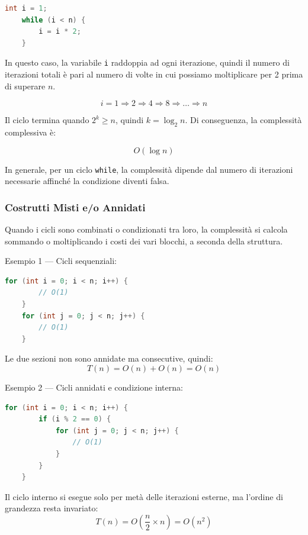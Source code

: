 \begin{lstlisting}[language=C++]
	int i = 1;
	while (i < n) {
		i = i * 2;
	}
\end{lstlisting}

In questo caso, la variabile \texttt{i} raddoppia ad ogni iterazione, quindi il numero di iterazioni totali è pari al numero di volte in cui possiamo moltiplicare per 2 prima di superare $n$.

\[
i = 1 \Rightarrow 2 \Rightarrow 4 \Rightarrow 8 \Rightarrow \dots \Rightarrow n
\]

Il ciclo termina quando $2^k \ge n$, quindi $k = \log_2 n$.  
Di conseguenza, la complessità complessiva è:

\[
O(\log n)
\]

In generale, per un ciclo \texttt{while}, la complessità dipende dal numero di iterazioni necessarie affinché la condizione diventi falsa.


\vspace{1cm}
\subsubsection{Costrutti Misti e/o Annidati}

Quando i cicli sono combinati o condizionati tra loro, la complessità si calcola sommando o moltiplicando i costi dei vari blocchi, a seconda della struttura.

Esempio 1 — Cicli sequenziali:
\begin{lstlisting}[language=C++]
	for (int i = 0; i < n; i++) {
		// O(1)
	}
	for (int j = 0; j < n; j++) {
		// O(1)
	}
\end{lstlisting}

Le due sezioni non sono annidate ma consecutive, quindi:
\[
T(n) = O(n) + O(n) = O(n)
\]

Esempio 2 — Cicli annidati e condizione interna:
\begin{lstlisting}[language=C++]
	for (int i = 0; i < n; i++) {
		if (i % 2 == 0) {
			for (int j = 0; j < n; j++) {
				// O(1)
			}
		}
	}
\end{lstlisting}

Il ciclo interno si esegue solo per metà delle iterazioni esterne, ma l’ordine di grandezza resta invariato:
\[
T(n) = O\left(\frac{n}{2} \times n\right) = O(n^2)
\]










\vspace{1cm}

